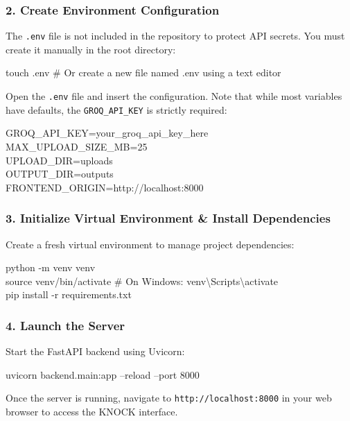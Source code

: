 \documentclass[12pt, a4paper]{article}
\begin{document}
\subsubsection{2. Create Environment Configuration}
The \texttt{.env} file is not included in the repository to protect API secrets. You must create it manually in the root directory:
\begin{codebox}
\small\ttfamily
touch .env \textcolor{midgray}{\# Or create a new file named .env using a text editor}
\end{codebox}
Open the \texttt{.env} file and insert the configuration. Note that while most variables have defaults, the \texttt{GROQ\_API\_KEY} is strictly required:
\begin{codebox}
\small\ttfamily
GROQ\_API\_KEY=your\_groq\_api\_key\_here\\
MAX\_UPLOAD\_SIZE\_MB=25\\
UPLOAD\_DIR=uploads\\
OUTPUT\_DIR=outputs\\
FRONTEND\_ORIGIN=http://localhost:8000
\end{codebox}

\subsubsection{3. Initialize Virtual Environment \& Install Dependencies}
Create a fresh virtual environment to manage project dependencies:
\begin{codebox}
\small\ttfamily
python -m venv venv\\
source venv/bin/activate  \textcolor{midgray}{\# On Windows: venv\textbackslash Scripts\textbackslash activate}\\
pip install -r requirements.txt
\end{codebox}

\subsubsection{4. Launch the Server}
Start the FastAPI backend using Uvicorn:
\begin{codebox}
\small\ttfamily
uvicorn backend.main:app --reload --port 8000
\end{codebox}

Once the server is running, navigate to \texttt{http://localhost:8000} in your web browser to access the KNOCK interface.

\end{document}
